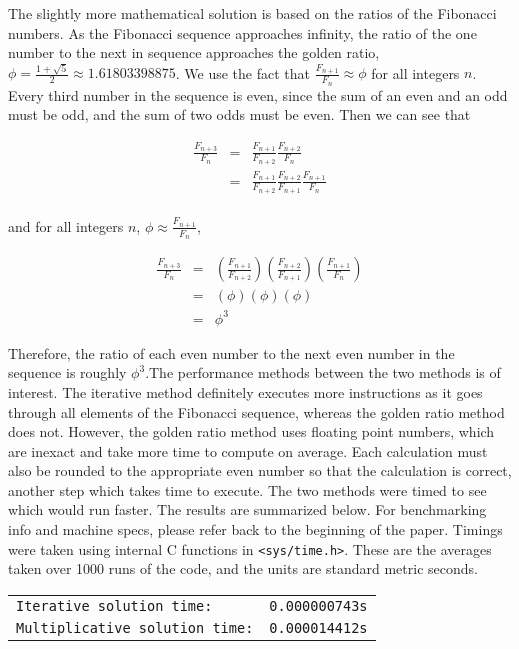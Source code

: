 \documentclass{article}
\begin{document}
The slightly more mathematical solution is based on the ratios of the Fibonacci numbers. As the Fibonacci sequence approaches infinity, the ratio of the one number to the next in sequence approaches the golden ratio, $\phi = \frac{1 + \sqrt{5}}{2} \approx 1.61803398875$. We use the fact that $\frac{F_{n+1}}{F_{n}} \approx \phi$ for all integers $n$.  Every third number in the sequence is even, since the sum of an even and an odd must be odd, and the sum of two odds must be even. Then we can see that

\begin{eqnarray*}
\frac{F_{n+3}}{F_{n}}	& = & \frac{F_{n+1}}{F_{n+2}}\frac{F_{n+2}}{F_{n}} \\
						& = & \frac{F_{n+1}}{F_{n+2}}\frac{F_{n+2}}{F_{n+1}}\frac{F_{n+1}}{F_{n}} \\
\end{eqnarray*}

and for all integers $n$, $\phi \approx \frac{F_{n+1}}{F_{n}}$, 

\begin{eqnarray*}
\frac{F_{n+3}}{F_{n}}	& = &\left(\frac{F_{n+1}}{F_{n+2}}\right)\left(\frac{F_{n+2}}{F_{n+1}}\right)\left(\frac{F_{n+1}}{F_{n}}\right) 	\\
						& = & (\phi)(\phi)(\phi)	\\
						& = & \phi^{3}
\end{eqnarray*}

Therefore, the ratio of each even number to the next even number in the sequence is roughly 
$\phi^{3}$.The performance methods between the two methods is of interest. The iterative 
method definitely executes more instructions as it goes through all elements of the Fibonacci 
sequence, whereas the golden ratio method does not. However, the golden ratio method uses 
floating point numbers, which are inexact and take more time to compute on average. Each 
calculation must also be rounded to the appropriate even number so that the calculation is 
correct, another step which takes time to execute. The two methods were timed to see which 
would run faster. The results are summarized below. For benchmarking info and machine specs, 
please refer back to the beginning of the paper. Timings were taken using internal C 
functions in \texttt{<sys/time.h>}. These are the averages taken over 1000 runs of the code, 
and the units are standard metric seconds. 

\begin{tabular}{ll}
\texttt{Iterative solution time:}		&	\texttt{0.000000743s}	\\
\texttt{Multiplicative solution time:}	&	\texttt{0.000014412s}
\end{tabular}
\end{document}
